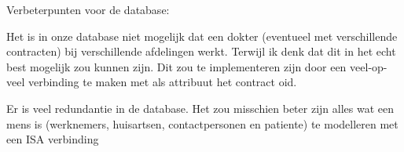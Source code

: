 Verbeterpunten voor de database:
\item{ Het is in onze database niet mogelijk dat een dokter 
  (eventueel met verschillende contracten) bij verschillende
  afdelingen werkt.  Terwijl ik denk dat dit in het echt best 
  mogelijk zou kunnen zijn. 
  Dit zou te implementeren zijn door een veel-op-veel verbinding 
  te maken met als attribuut het contract oid.}
\item{ Er is veel redundantie in de database. Het zou misschien beter zijn 
  alles wat een mens is (werknemers, huisartsen, contactpersonen en patiente) te modelleren met een ISA verbinding}
